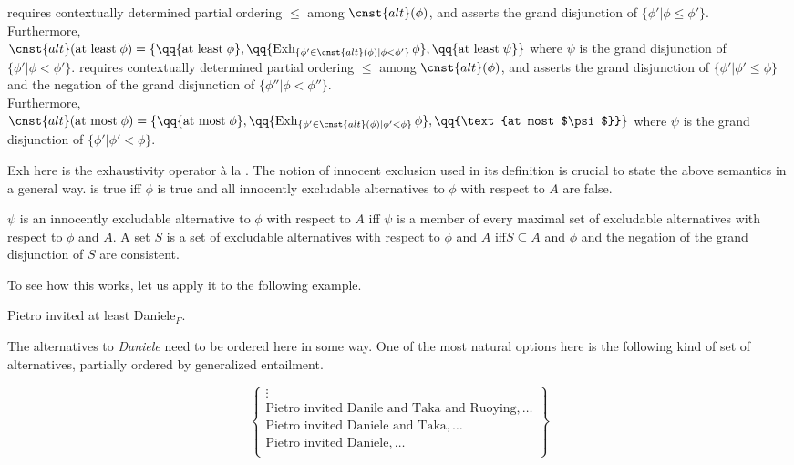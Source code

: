 \documentclass[output=paper]{langscibook}
\begin{document}
\eanoraggedright
  \eanoraggedright
   requires contextually determined partial ordering $\leq$ among $\cnst{alt}(\phi)$, and asserts the grand disjunction of $\{\phi' | \phi \leq \phi'\}$.\smallskip\\Furthermore,\\$\cnst{alt}(\text{at least}\;\phi)=\{\qq{\text{at least} \;\phi}, \qq{\text{Exh}_{\{\phi'\in \cnst{alt}(\phi) | \phi <\phi' \}}\,\phi}, \qq{\text{at least}\;\psi}\}$ where $\psi$ is the grand disjunction of $\{\phi' | \phi < \phi'\}$.\smallskip
  \ex
  requires contextually determined partial ordering $\leq$ among $\cnst{alt}(\phi)$, and asserts the grand disjunction of $\{\phi' | \phi' \leq \phi\}$ and the negation of the grand disjunction of $\{\phi'' | \phi < \phi''\}$.\smallskip\\Furthermore,\\$\cnst{alt}(\text{at most}\;\phi)=\{\qq{\text{at most}\;\phi}, \qq{\text{Exh}_{\{\phi'\in \cnst{alt}(\phi) | \phi' <\phi \}}\,\phi}, \qq{\text{at most $\psi$}}\}$ where $\psi$ is the grand disjunction of $\{\phi' | \phi' < \phi\}$.
  \z
\z

\noindent Exh here is the exhaustivity operator \`a la \citet{fox}. The notion of innocent exclusion used in its definition is crucial to state the above semantics in a general way.
\ea {} is true iff $\phi$ is true and all innocently excludable alternatives to $\phi$ with respect to $A$ are false.\z

\eanoraggedright
  \eanoraggedright $\psi$ is an innocently excludable alternative to $\phi$ with respect to $A$ iff $\psi$ is a member of every maximal set of excludable alternatives with respect to $\phi$ and $A$.
  \ex A set $S$ is a set of excludable alternatives with respect to $\phi$ and $A$ iff\linebreak $S\subseteq A$ and $\phi$ and the negation of the grand disjunction of $S$ are consistent.
  \z
\z

\noindent To see how this works, let us apply it to the following example.

\ea Pietro invited at least Daniele$_F$.\z

\noindent The alternatives to \textit{Daniele} need to be ordered here in some way. One of the most natural options here is the following kind of set of alternatives, partially ordered by generalized entailment.

\[
\left\{\begin{array}{l}
  \vdots\\
  \text{Pietro invited Danile and Taka and Ruoying}, \dots\\
  \text{Pietro invited Daniele and Taka}, \dots\\
\text{Pietro invited Daniele},\dots\\
\end{array}\right\}
\]
\end{document}
